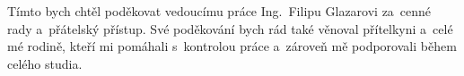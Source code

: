 \documentclass[czech,bachelor,unicode]{ctufit-thesis}
\theoremstyle{plain}
\theoremstyle{definition}
\theoremstyle{remark}
\numberwithin{theorem}{chapter}
\begin{document}
 
\frontmatter\frontmatterinit %


\thispagestyle{empty}\cleardoublepage\maketitle %

\imprintpage %

\tableofcontents %
\listoffigures %
\begingroup
\let\clearpage\relax
\listoftables %
\lstlistoflistings %
\endgroup

\begin{acknowledgmentpage}
	Tímto bych chtěl poděkovat vedoucímu práce Ing.~Filipu Glazarovi za~cenné rady a~přátelský přístup. Své poděkování bych rád také věnoval přítelkyni a~celé mé rodině, kteří mi pomáhali s~kontrolou práce a~zároveň mě podporovali během celého studia.
\end{acknowledgmentpage} 
\end{document}
